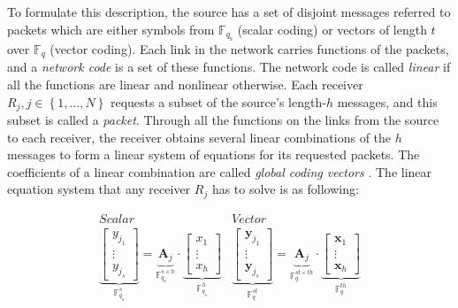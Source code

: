 To formulate this description, the source has a set of disjoint messages
referred to packets which are either symbols from $\ensuremath{\mathbb{F}}_{q_{\mathrm{s}}}$
(scalar coding) or vectors of length $t$ over $\ensuremath{\mathbb{F}}_{q}$
(vector coding). Each link in the network carries functions of the
packets, and a \textit{network code} is a set of these functions.
The network code is called \textit{linear} if all the functions are
linear and nonlinear otherwise. Each receiver $R_{j},j\in\left\{ 1,\ldots,N\right\} $
requests a subset of the source's length-$h$ messages, and this subset
is called a \textit{packet}. Through all the functions on the links
from the source to each receiver, the receiver obtains several linear
combinations of the $h$ messages to form a linear system of equations
for its requested packets. The coefficients of a linear combination
are called \textit{global coding vectors} \cite{Sanders:2003}. The
linear equation system that any receiver $R_{j}$ has to solve is
as following:

\begin{equation}
\begin{array}{c|c}
Scalar & Vector\\
\underset{\ensuremath{\mathbb{F}}_{q_{\mathrm{s}}}^{s}}{\underbrace{\left[\begin{array}{c}
y_{j_{1}}\\
\vdots\\
y_{j_{s}}
\end{array}\right]}}=\underset{\ensuremath{\mathbb{F}}_{q_{\mathrm{s}}}^{s\times h}}{\underbrace{\boldsymbol{A}_{j}}}\cdot\underset{\ensuremath{\mathbb{F}}_{q_{s}}^{h}}{\underbrace{\left[\begin{array}{c}
x_{1}\\
\vdots\\
x_{h}
\end{array}\right]}} & \underset{\ensuremath{\mathbb{F}}_{q}^{st}}{\underbrace{\left[\begin{array}{c}
\boldsymbol{y}_{j_{1}}\\
\vdots\\
\boldsymbol{y}_{j_{s}}
\end{array}\right]}}=\underset{\ensuremath{\mathbb{F}}_{q}^{st\times th}}{\underbrace{\boldsymbol{A}_{j}}}\cdot\underset{\ensuremath{\mathbb{F}}_{q}^{th}}{\underbrace{\left[\begin{array}{c}
\boldsymbol{x}_{1}\\
\vdots\\
\boldsymbol{x}_{h}
\end{array}\right]}}
\end{array}\label{eq:linear_system}
\end{equation}

